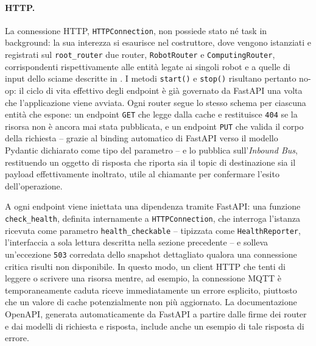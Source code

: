 \paragraph{HTTP.}
La connessione \ac{HTTP}, \texttt{HTTPConnection}, non possiede stato né task in background: la sua interezza si esaurisce nel costruttore, dove vengono istanziati e registrati sul \texttt{root\_router} due router, \texttt{RobotRouter} e \texttt{ComputingRouter}, corrispondenti rispettivamente alle entità legate ai singoli robot e a quelle di input dello sciame descritte in . I metodi \texttt{start()} e \texttt{stop()} risultano pertanto no-op: il ciclo di vita effettivo degli endpoint è già governato da FastAPI una volta che l'applicazione viene avviata. Ogni router segue lo stesso schema per ciascuna entità che espone: un endpoint \texttt{GET} che legge dalla cache e restituisce \texttt{404} se la risorsa non è ancora mai stata pubblicata, e un endpoint \texttt{PUT} che valida il corpo della richiesta -- grazie al binding automatico di FastAPI verso il modello Pydantic dichiarato come tipo del parametro -- e lo pubblica sull'\textit{Inbound Bus}, restituendo un oggetto di risposta che riporta sia il topic di destinazione sia il payload effettivamente inoltrato, utile al chiamante per confermare l'esito dell'operazione.

A ogni endpoint viene iniettata una dipendenza tramite FastAPI: una funzione \texttt{check\_health}, definita internamente a \texttt{HTTPConnection}, che interroga l'istanza ricevuta come parametro \texttt{health\_checkable} -- tipizzata come \texttt{HealthReporter}, l'interfaccia a sola lettura descritta nella sezione precedente -- e solleva un'eccezione \texttt{503} corredata dello snapshot dettagliato qualora una connessione critica risulti non disponibile. In questo modo, un client \ac{HTTP} che tenti di leggere o scrivere una risorsa mentre, ad esempio, la connessione \ac{MQTT} è temporaneamente caduta riceve immediatamente un errore esplicito, piuttosto che un valore di cache potenzialmente non più aggiornato. La documentazione \ac{OpenAPI}, generata automaticamente da FastAPI a partire dalle firme dei router e dai modelli di richiesta e risposta, include anche un esempio di tale risposta di errore.

